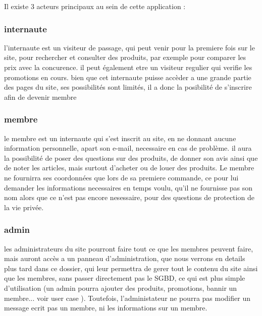 Il existe 3 acteurs principaux au sein de cette application :

\subsubsection{internaute} 

l'internaute est un visiteur de passage, qui peut venir pour la premiere fois sur le site, pour rechercher et consulter des produits, par exemple pour comparer
les prix avec la concurence. il peut également etre un visiteur regulier qui verifie les promotions en cours. bien que cet internaute puisse accèder a une grande partie des pages du site, ses possibilités sont limités, il a donc la posibilité de s'inscrire afin de devenir membre

\subsubsection{membre}

le membre est un internaute qui s'est inscrit au site, en ne donnant aucune information personnelle, apart son e-mail, necessaire en cas de problème. 
il aura la possibilité de poser des questions sur des produits, de donner son avis ainsi que de noter les articles, mais surtout d'acheter ou de louer des produits.
Le membre ne fournirra ses coordonnées que lors de sa premiere commande, ce pour lui demander les informations necessaires en temps voulu, qu'il ne fournisse pas son nom alors que ce n'est pas encore nesessaire, pour des questions de protection de la vie privée.

\subsubsection{admin}

les administrateurs du site pourront faire tout ce que les membres peuvent faire, mais auront accès a un panneau d'administration, que nous verrons en details plus tard dans ce dossier, qui leur permettra de gerer tout le contenu du site ainsi que les membres, sans passer directement pas le SGBD, ce qui est plus simple d'utilisation (un admin pourra ajouter des produits, promotions, bannir un membre... voir user case  ).
Toutefois, l'administateur ne pourra pas modifier un message ecrit pas un membre, ni les informations sur un membre.

